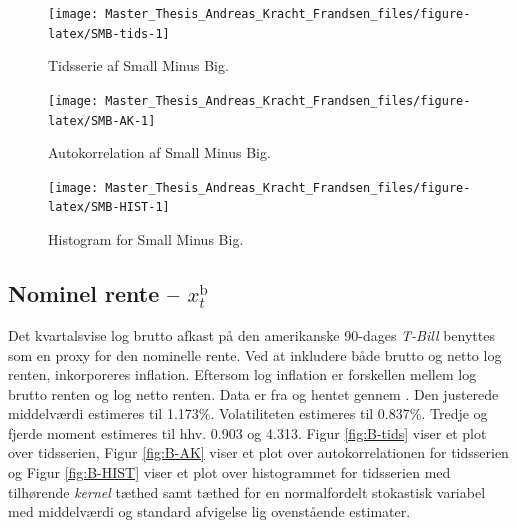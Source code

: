 \documentclass[
  a4paper,
  oneside]{memoir}
\begin{document}
\begin{figure}[H]

{\centering \texttt{[image: Master\_Thesis\_Andreas\_Kracht\_Frandsen\_files/figure-latex/SMB-tids-1]} 

}

\caption{Tidsserie af Small Minus Big.}\label{fig:SMB-tids}
\end{figure}

\begin{figure}[H]

{\centering \texttt{[image: Master\_Thesis\_Andreas\_Kracht\_Frandsen\_files/figure-latex/SMB-AK-1]} 

}

\caption{Autokorrelation af Small Minus Big.}\label{fig:SMB-AK}
\end{figure}

\begin{figure}[H]

{\centering \texttt{[image: Master\_Thesis\_Andreas\_Kracht\_Frandsen\_files/figure-latex/SMB-HIST-1]} 

}

\caption{Histogram for Small Minus Big.}\label{fig:SMB-HIST}
\end{figure}

\hypertarget{nominel-rente-x_ttextb}{%
\subsection{\texorpdfstring{Nominel rente -- \(x_t^{\text{b}}\)}{Nominel rente -- x\_t\^{}\{\textbackslash text\{b\}\}}}\label{nominel-rente-x_ttextb}}

Det kvartalsvise log brutto afkast på den amerikanske 90-dages \emph{T-Bill} benyttes som en proxy for den nominelle rente. Ved at inkludere både brutto og netto log renten, inkorporeres inflation. Eftersom log inflation er forskellen mellem log brutto renten og log netto renten. Data er fra \citep{CRSPt90} og hentet gennem \citep{WRDSt90}. Den justerede middelværdi estimeres til 1.173\(\%\). Volatiliteten estimeres til 0.837\(\%\). Tredje og fjerde moment estimeres til hhv. 0.903 og 4.313. Figur \ref{fig:B-tids} viser et plot over tidsserien, Figur \ref{fig:B-AK} viser et plot over autokorrelationen for tidsserien og Figur \ref{fig:B-HIST} viser et plot over histogrammet for tidsserien med tilhørende \emph{kernel} tæthed samt tæthed for en normalfordelt stokastisk variabel med middelværdi og standard afvigelse lig ovenstående estimater.
\end{document}
